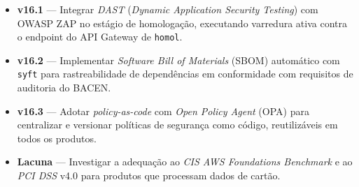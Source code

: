 \begin{itemize}[leftmargin=*]
  \item \textbf{v16.1} --- Integrar \textit{DAST}
        (\textit{Dynamic Application Security Testing}) com OWASP ZAP
        no est\'agio de homologa\c{c}\~ao, executando varredura ativa
        contra o endpoint do API Gateway de \texttt{homol}.
  \item \textbf{v16.2} --- Implementar \textit{Software Bill of Materials}
        (SBOM) autom\'atico com \texttt{syft} para
        rastreabilidade de depend\^encias em conformidade com
        requisitos de auditoria do BACEN.
  \item \textbf{v16.3} --- Adotar \textit{policy-as-code}
        com \textit{Open Policy Agent} (OPA)
        para centralizar e versionar pol\'iticas de seguran\c{c}a como
        c\'odigo, reutiliz\'aveis em todos os produtos.
  \item \textbf{Lacuna} --- Investigar a adequa\c{c}\~ao ao
        \textit{CIS AWS Foundations Benchmark} e ao
        \textit{PCI DSS} v4.0 para produtos que processam dados de cart\~ao.
\end{itemize}

